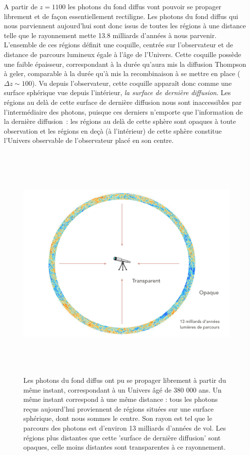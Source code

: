 A partir de $z=1100$ les photons du fond diffus vont pouvoir se propager librement et de façon essentiellement rectiligne. Les photons du fond diffus qui nous parviennent aujourd'hui sont donc issus de toutes les régions à une distance telle que le rayonnement mette 13.8 milliards d'années à nous parvenir. L'ensemble de ces régions définit une coquille, centrée sur l'observateur et de distance de parcours lumineux égale à l'âge de l'Univers. Cette coquille possède une faible épaisseur, correspondant à la durée qu'aura mis la diffusion Thompson à geler, comparable à la durée qu'à mis la recombinaison à se mettre en place ($\Delta z\sim 100$). Vu depuis l'observateur, cette coquille apparaît donc comme une surface sphérique vue depuis l'intérieur, \textit{la surface de dernière diffusion}. Les régions au delà de cette surface de dernière diffusion nous sont inaccessibles par l'intermédiaire des photons, puisque ces derniers n'emporte que l'information de la dernière diffusion~: les régions au delà de cette sphère sont opaques à toute observation et les régions en deçà (à l'intérieur) de cette sphère constitue l'Univers observable de l'observateur placé en son centre.

\begin{figure}[htbp]
	\centering
		\includegraphics[height=12cm]{figs/LSS.png}
	\caption[L'Univers devient transparent au CMB]{Les photons du fond diffus ont pu se propager librement à partir du même instant, correspondant à un Univers âgé de 380 000 ans. Un même instant correspond à une même distance : tous les photons reçus aujourd'hui proviennent de régions situées sur une surface sphérique, dont nous sommes le centre. Son rayon est tel que le parcours des photons est d'environ 13 milliards d'années de vol. Les régions plus distantes que cette 'surface de dernière diffusion' sont opaques, celle moins distantes sont transparentes à ce rayonnement.}
	\label{f:LSS}
\end{figure}

